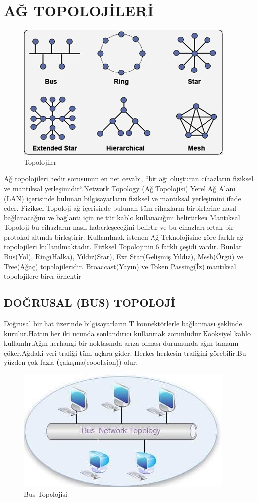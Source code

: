  \section*{AĞ TOPOLOJİLERİ }
\begin{figure}[!ht]
    \includegraphics{images/62_ağ_topolojisi}
   \caption{Topolojiler}
    \label{fig:topolojiler}
 \end{figure}
Ağ topolojileri nedir sorusunun en net cevabı, “bir ağı oluşturan cihazların fiziksel ve mantıksal yerleşimidir“.Network Topology (Ağ Topolojisi) Yerel Ağ Alanı (LAN) içerisinde bulunan bilgisayarların fiziksel ve mantıksal yerleşimini ifade eder. Fiziksel Topoloji ağ içerisinde bulunan tüm cihazların birbirlerine nasıl bağlanacağını ve bağlantı için ne tür kablo kullanacığını belirtirken Mantıksal Topoloji bu cihazların nasıl haberleşeceğini belirtir ve bu cihazları ortak bir protokol altında birleştirir. Kullanılmak istenen Ağ Teknolojisine göre farklı ağ topolojileri kullanılmaktadır.
Fiziksel Topolojinin 6 farklı çeşidi vardır. Bunlar Bus(Yol), Ring(Halka), Yıldız(Star), Ext Star(Gelişmiş Yıldız), Mesh(Örgü) ve Tree(Ağaç) topolojileridir. Broadcast(Yayın) ve Token Passing(İz) mantıksal topolojilere birer örnektir 

\subsection*{DOĞRUSAL (BUS) TOPOLOJİ}
Doğrusal bir hat üzerinde bilgisayarların T konnektörlerle bağlanması şeklinde kurulur.Hattın her iki ucunda 
sonlandırıcı kullanmak zorunludur.Kooksiyel kablo kullanılır.Ağın herhangi  bir noktasında arıza olması durumunda ağın tamamı çöker.Ağdaki veri trafiği tüm uçlara gider.
Herkes herkesin trafiğini görebilir.Bu yüzden çok fazla \textbf(çakışma(cooolision)) olur.
\begin{figure}[!ht]
    \includegraphics{images/bus-topolojisi}
   \caption{Bus Topolojisi}
   \label{fig:bustopolojisi}
 \end{figure}

